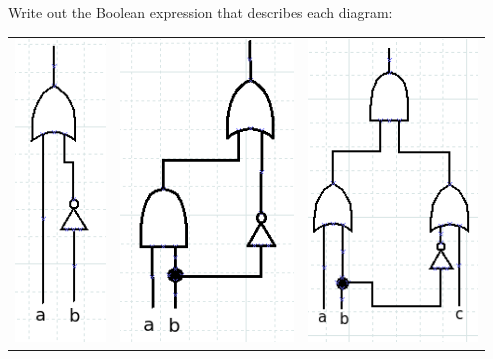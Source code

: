 \documentclass[a4paper,12pt]{book}
\newcounter{question}
\begin{document}
        \newpage

        \begin{questionNOGRADE}{\thequestion}

            Write out the Boolean expression that describes each diagram:


            \begin{center}
                \begin{tabular}{c | c | c}
                    \includegraphics[height=8cm]{images/3-5-gate4.png} &
                    \includegraphics[height=8cm]{images/3-5-gate5.png} &
                    \includegraphics[height=8cm]{images/3-5-gate6.png}

\end{tabular}
\end{center}
\end{questionNOGRADE}
\end{document}
